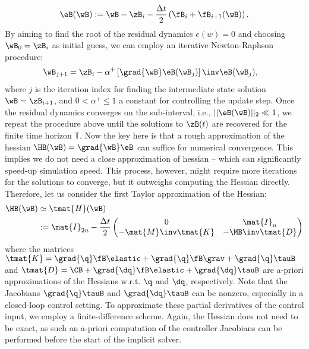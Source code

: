 %
\begin{align}
\eB(\wB) :=  \wB - \zB_{i} - \frac{\Delta t}{2} \left( \fB_i + \fB_{i+1}(\wB)  \right).
\end{align}
%
By aiming to find the root of the residual dynamics $e(w) = 0$ and choosing $\wB_{0} = \zB_{i}$ as initial guess, we can employ an iterative Newton-Raphson procedure:
%
\begin{align}
\wB_{j+1} & = \zB_i  - \alpha^+ \left[\grad{\wB}\eB(\wB_j)\right]\inv \eB(\wB_{j}),
\end{align}
%
where $j$ is the iteration index for finding the intermediate state solution $\wB=\zB_{i+1}$, and $0 < \alpha^+ \le 1$ a constant for controlling the update step. Once the residual dynamics converges on the sub-interval, i.e., $||\eB(\wB)||_2 \ll 1$, we repeat the procedure above until the solutions to $\zB(t)$ are recovered for the finite time horizon $\mathbb{T}$. \editl Now the key here is that a rough approximation of the hessian $\HB(\wB) = \grad{\wB} \eB$ can suffice for numerical convergence. This implies we do not need a close approximation of hessian -- which can significantly speed-up simulation speed. This process, however, might require more iterations for the solutions to converge, but it outweighs computing the Hessian directly\editr. Therefore, let us consider the first Taylor approximation of the Hessian:
%
\begin{align}
    \HB(\wB) & \simeq \tmat{H}(\wB) \notag \\ & := \mat{I}_{2n } - \frac{\Delta t}{2} \begin{pmatrix} 0 & \mat{I}_{n}  \\
 -\mat{M} \inv \tmat{K} & -\MB\inv \tmat{D}
  \end{pmatrix}
\end{align}
where the matrices $\tmat{K} = \grad{\q}\fB\elastic + \grad{\q}\fB\grav + \grad{\q}\tauB$ and $\tmat{D} = \CB + \grad{\dq}\fB\elastic + \grad{\dq}\tauB$ are a-priori approximations of the Hessians w.r.t. $\q$ and $\dq$, respectively. Note that the Jacobians $\grad{\q}\tauB$ and $\grad{\dq}\tauB$ can be nonzero, especially in a closed-loop control setting. To approximate these partial derivatives of the control input, we employ a finite-difference scheme. Again, the Hessian does not need to be exact, as such an a-priori computation of the controller Jacobians can be performed before the start of the implicit solver.

